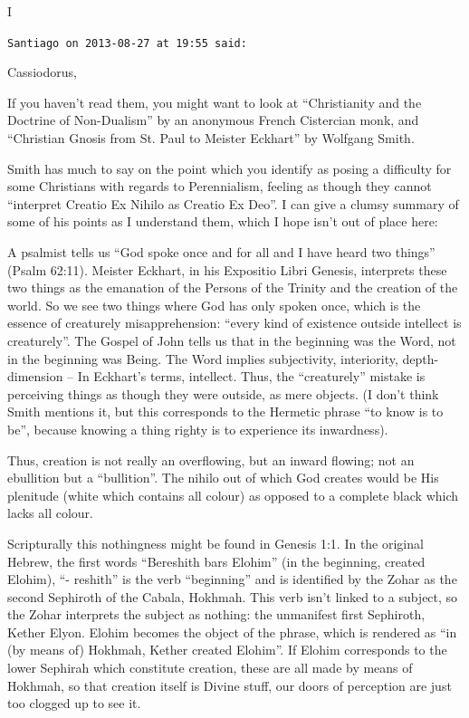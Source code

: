 \begin{footnotesize}
\begin{sffamily}
I

\hfill

\texttt{Santiago on 2013-08-27 at 19:55 said:}

Cassiodorus,

If you haven't read them, you might want to look at ``Christianity and the Doctrine of Non-Dualism'' by an anonymous French Cistercian monk, and ``Christian Gnosis from St. Paul to Meister Eckhart'' by Wolfgang Smith.

Smith has much to say on the point which you identify as posing a difficulty for some Christians with regards to Perennialism, feeling as though they cannot ``interpret Creatio Ex Nihilo as Creatio Ex Deo''. I can give a clumsy summary of some of his points as I understand them, which I hope isn't out of place here:

A psalmist tells us ``God spoke once and for all and I have heard two things'' (Psalm 62:11). Meister Eckhart, in his Expositio Libri Genesis, interprets these two things as the emanation of the Persons of the Trinity and the creation of the world. So we see two things where God has only spoken once, which is the essence of creaturely misapprehension: ``every kind of existence outside intellect is creaturely''. The Gospel of John tells us that in the beginning was the Word, not in the beginning was Being. The Word implies subjectivity, interiority, depth-dimension -- In Eckhart's terms, intellect. Thus, the ``creaturely'' mistake is perceiving things as though they were outside, as mere objects. (I don't think Smith mentions it, but this corresponds to the Hermetic phrase ``to know is to be'', because knowing a thing righty is to experience its inwardness).

Thus, creation is not really an overflowing, but an inward flowing; not an ebullition but a ``bullition''. The nihilo out of which God creates would be His plenitude (white which contains all colour) as opposed to a complete black which lacks all colour.

Scripturally this nothingness might be found in Genesis 1:1. In the original Hebrew, the first words ``Bereshith bars Elohim'' (in the beginning, created Elohim), ``- reshith'' is the verb ``beginning'' and is identified by the Zohar as the second Sephiroth of the Cabala, Hokhmah. This verb isn't linked to a subject, so the Zohar interprets the subject as nothing: the unmanifest first Sephiroth, Kether Elyon. Elohim becomes the object of the phrase, which is rendered as ``in (by means of) Hokhmah, Kether created Elohim''. If Elohim corresponds to the lower Sephirah which constitute creation, these are all made by means of Hokhmah, so that creation itself is Divine stuff, our doors of perception are just too clogged up to see it.


\end{sffamily}
\end{footnotesize}

